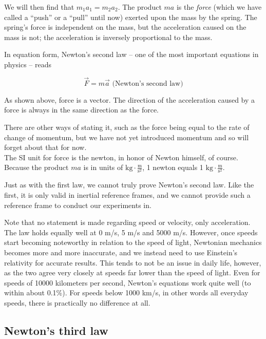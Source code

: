 We will then find that $m_1 a_1 = m_2 a_2$. The product $m a$ is the \emph{force} (which we have called a ``push'' or a ``pull'' until now) exerted upon the mass by the spring. The spring's force is independent on the mass, but the acceleration caused on the mass is not; the acceleration is inversely proportional to the mass.

In equation form, Newton's second law -- one of the most important equations in physics -- reads

\begin{equation}
\vec{F} = m \vec{a} \text{ (Newton's second law)} \label{eq:newton2}
\end{equation}

As shown above, force is a vector. The direction of the acceleration caused by a force is always in the same direction as the force.

There are other ways of stating it, such as the force being equal to the rate of change of momentum, but we have not yet introduced momentum and so will forget about that for now.\\
The SI unit for force is the newton, in honor of Newton himself, of course. Because the product $m a$ is in units of $\displaystyle \text{kg} \cdot \frac{\text{m}}{\text{s}^2}$, 1 newton equals 1 $\displaystyle \text{kg} \cdot \frac{\text{m}}{\text{s}^2}$.

Just as with the first law, we cannot truly prove Newton's second law. Like the first, it is only valid in inertial reference frames, and we cannot provide such a reference frame to conduct our experiments in.

Note that no statement is made regarding speed or velocity, only acceleration. The law holds equally well at 0 m/s, 5 m/s and 5000 m/s. However, once speeds start becoming noteworthy in relation to the speed of light, Newtonian mechanics becomes more and more inaccurate, and we instead need to use Einstein's relativity for accurate results. This tends to not be an issue in daily life, however, as the two agree very closely at speeds far lower than the speed of light. Even for speeds of 10000 kilometers per second, Newton's equations work quite well (to within about 0.1\%). For speeds below 1000 km/s, in other words all everyday speeds, there is practically no difference at all.

\subsection{Newton's third law}

